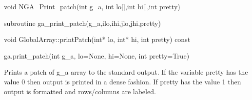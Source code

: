 \documentclass[12pt]{article}
\begin{document}
\begin{capi}
\begin{ccode}
void NGA_Print_patch(int g_a, int lo[],int hi[],int pretty)
\end{ccode}
\begin{funcargs}
\end{funcargs}
\end{capi}

\begin{f2dapi}
\begin{fcode}
subroutine ga_print_patch(g_a,ilo,ihi,jlo,jhi,pretty)
\end{fcode}
\begin{funcargs}
\end{funcargs}
\end{f2dapi}

\begin{cxxapi}
\begin{cxxcode}
void GlobalArray::printPatch(int* lo, int* hi, int pretty) const
\end{cxxcode}
\begin{funcargs}
\end{funcargs}
\end{cxxapi}

\begin{pyapi}
\begin{pycode}
ga.print_patch(int g_a, lo=None, hi=None, int pretty=True)
\end{pycode}
\begin{funcargs}
\end{funcargs}
\end{pyapi}

\gcoll

\begin{desc}

Prints a patch of g_a array to the standard output. If the variable pretty has
the value 0 then output is printed in a dense fashion. If pretty has the value
1 then output is formatted and rows/columns are labeled.

\end{desc}
\end{document}
